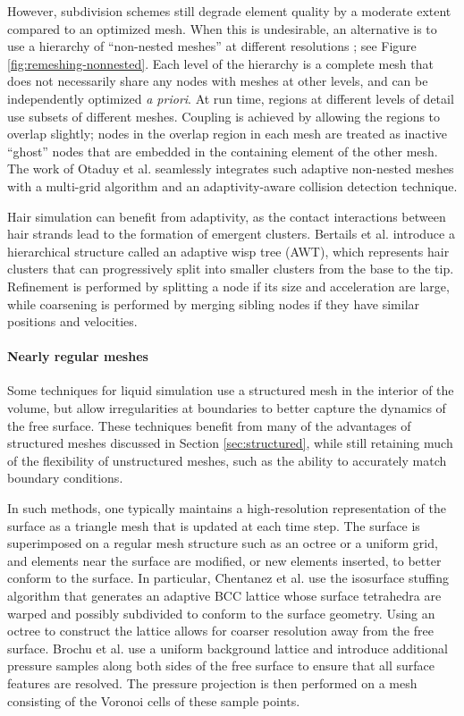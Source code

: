 However, subdivision schemes still degrade element quality by a moderate extent compared to an optimized mesh.
When this is undesirable, an alternative is to use a hierarchy of ``non-nested meshes'' at different resolutions \cite{Debunne2000,Debunne2001}; see Figure \ref{fig:remeshing-nonnested}.
Each level of the hierarchy is a complete mesh that does not necessarily share any nodes with meshes at other levels, and can be independently optimized \textit{a priori}.
At run time, regions at different levels of detail use subsets of different meshes.
Coupling is achieved by allowing the regions to overlap slightly; nodes in the overlap region in each mesh are treated as inactive ``ghost'' nodes that are embedded in the containing element of the other mesh.
The work of Otaduy et al. \cite{Otaduy2007} seamlessly integrates such adaptive non-nested meshes with a multi-grid algorithm and an adaptivity-aware collision detection technique.

Hair simulation can benefit from adaptivity, as the contact interactions between hair strands lead to the formation of emergent clusters.
Bertails et al. \cite{Bertails2003} introduce a hierarchical structure called an adaptive wisp tree (AWT), which represents hair clusters that can progressively split into smaller clusters from the base to the tip.
Refinement is performed by splitting a node if its size and acceleration are large, while coarsening is performed by merging sibling nodes if they have similar positions and velocities.

\paragraph*{Nearly regular meshes}
Some techniques for liquid simulation use a structured mesh in the interior of the volume, but allow irregularities at boundaries to better capture the dynamics of the free surface.
These techniques benefit from many of the advantages of structured meshes discussed in Section \ref{sec:structured}, while still retaining much of the flexibility of unstructured meshes, such as the ability to accurately match boundary conditions.

In such methods, one typically maintains a high-resolution representation of the surface as a triangle mesh that is updated at each time step.
The surface is superimposed on a regular mesh structure such as an octree or a uniform grid, and elements near the surface are modified, or new elements inserted, to better conform to the surface.
In particular, Chentanez et al. \cite{Chentanez2007} use the isosurface stuffing algorithm \cite{Labelle2007} that generates an adaptive BCC lattice whose surface tetrahedra are warped and possibly subdivided to conform to the surface geometry.
Using an octree to construct the lattice allows for coarser resolution away from the free surface.
Brochu et al. \cite{Brochu2010} use a uniform background lattice and introduce additional pressure samples along both sides of the free surface to ensure that all surface features are resolved.
The pressure projection is then performed on a mesh consisting of the Voronoi cells of these sample points.

